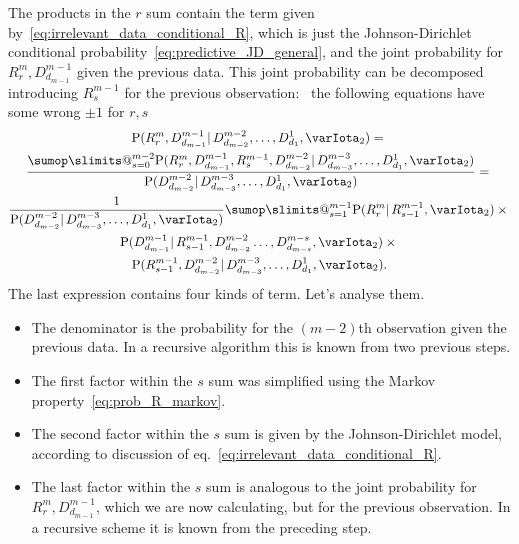 \documentclass[\ifafour a4paper,12pt,\else a5paper,10pt,\fi%
onecolumn,oneside,article,%
british%
]{memoir}
\makeatletter
\theoremstyle{remark}
\theoremstyle{innote}
\def\sum{\DOTSI\sumop\slimits@}
\newcommand*{\p}{\mathrm{P}}%
\renewcommand*{\|}{\mathpunct{|}}
\newcommand*{\eqn}{eq.}%
\newcommand*{\puzzle}{\maltese}
\newcommand{\mynote}[1]{ {\color{notecolour}\puzzle\ #1\ }}
\newcommand*{\yI}{\varIota}
\newcommand*{\yMc}{\yI_2}
\makeatother
\begin{document}
The products in the $r$ sum contain the term given
by~\eqref{eq:irrelevant_data_conditional_R}, which is just the
Johnson-Dirichlet conditional probability~\eqref{eq:predictive_JD_general},
and the joint probability for $R^{m}_{r}, D^{m-1}_{d_{m-1}}$ given the
previous data. This joint probability can be decomposed introducing
$R^{m-1}_{s}$ for the previous observation:\mynote{the following equations
  have some wrong $\pm1$ for $r,s$}
\begin{multline}
  \label{eq:prob_R_and_last_decompose}
  \p(R^{m}_{r}, D^{m-1}_{d_{m-1}} \| D^{m-2}_{d_{m-2}}, \dotsc, D^{1}_{d_{1}}, \yMc) 
 ={} \\
  \frac{\sum_{s=0}^{m-2}
    \p(R^{m}_{r}, D^{m-1}_{d_{m-1}}, R^{m-1}_{s}, D^{m-2}_{d_{m-2}}
    \| D^{m-3}_{d_{m-3}}, \dotsc, D^{1}_{d_{1}}, \yMc)}{
\p(D^{m-2}_{d_{m-2}} \| D^{m-3}_{d_{m-3}}, \dotsc, D^{1}_{d_{1}}, \yMc)}
  ={}\\
    \frac{1}{\p(D^{m-2}_{d_{m-2}} \| D^{m-3}_{d_{m-3}}, \dotsc, D^{1}_{d_{1}}, \yMc)}
  \sum_{s=1}^{m-1} \p(R^{m}_{r} \| R^{m-1}_{s-1}, \yMc)
  \times{}\\
  \p(D^{m-1}_{d_{m-1}} \|
    R^{m-1}_{s-1}, D^{m-2}_{d_{m-2}} \dotsc, D^{m-s}_{d_{m-s}}, \yMc)
    \times{}\\
 \p(R^{m-1}_{s-1}, D^{m-2}_{d_{m-2}} \|
  D^{m-3}_{d_{m-3}},\dotsc, D^{1}_{d_{1}}, \yMc).
\end{multline}
The last expression contains four kinds of term. Let's analyse them.

\begin{itemize}
\item The denominator is the probability for the $(m-2)$th observation
  given the previous data. In a recursive algorithm this is known from two
  previous steps.

\item The first factor within the $s$ sum was simplified using the Markov
  property~\eqref{eq:prob_R_markov}.

\item The second factor within the $s$ sum is given by the
  Johnson-Dirichlet model, according to discussion of
  \eqn~\eqref{eq:irrelevant_data_conditional_R}.

\item The last factor within the $s$ sum is analogous to the joint
  probability for $R^{m}_{r}, D^{m-1}_{d_{m-1}}$, which we are now
  calculating, but for the previous observation. In a recursive scheme it
  is known from the preceding step.
\end{itemize}
\end{document}
